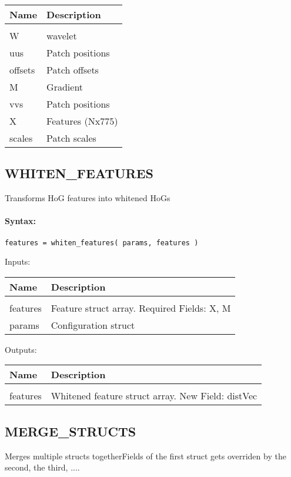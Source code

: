 \begin{tabular}{|l|p{5cm}|}
\hline
\textbf{Name} & \textbf{Description} \\
\hline \hline \\
W & wavelet  \\ \hline
uus & Patch positions  \\ \hline
offsets & Patch offsets  \\ \hline
M & Gradient  \\ \hline
vvs & Patch positions  \\ \hline
X & Features (Nx775)  \\ \hline
scales & Patch scales  \\ \hline
\end{tabular}

\subsection{WHITEN\_FEATURES}

Transforms HoG features into whitened HoGs

\paragraph{Syntax:} \verb|features = whiten_features( params, features )|

Inputs:

\begin{tabular}{|l|p{5cm}|}
\hline
\textbf{Name} & \textbf{Description} \\
\hline \hline \\
features & Feature struct array. Required Fields: X, M  \\ \hline
params & Configuration struct  \\ \hline
\end{tabular}
Outputs:

\begin{tabular}{|l|p{5cm}|}
\hline
\textbf{Name} & \textbf{Description} \\
\hline \hline \\
features & Whitened feature struct array. New Field: distVec  \\ \hline
\end{tabular}

\subsection{MERGE\_STRUCTS}

Merges multiple structs togetherFields of the first struct gets overriden by the second, the third, ....

